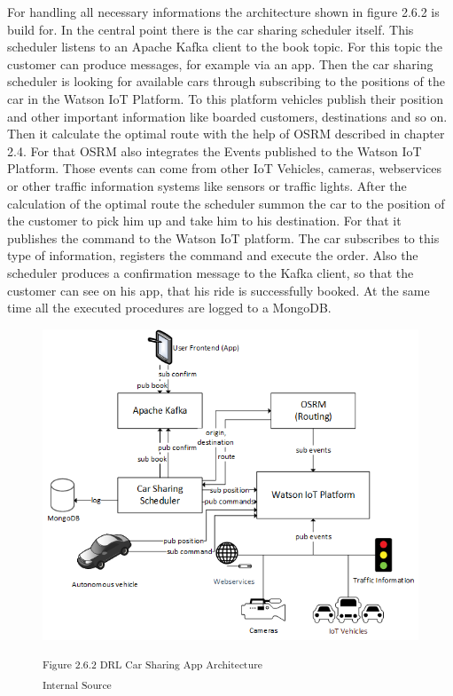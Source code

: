For handling all necessary informations the architecture shown in figure 2.6.2 is build for. In the central point there is the car sharing scheduler itself. This scheduler listens to an Apache Kafka client to the book topic. For this topic the customer can produce messages, for example via an app. Then the car sharing scheduler is looking for available cars through subscribing to the positions of the car in the Watson IoT Platform. To this platform vehicles publish their position and other important information like boarded customers, destinations and so on. Then it calculate the optimal route with the help of OSRM described in chapter 2.4. For that OSRM also integrates the Events published to the Watson IoT Platform. Those events can come from other IoT Vehicles, cameras, webservices or other traffic information systems like sensors or traffic lights. After the calculation of the optimal route the scheduler summon the car to the position of the customer to pick him up and take him to his destination. For that it publishes the command to the Watson IoT platform. The car subscribes to this type of information, registers the command and execute the order. Also the scheduler produces a confirmation message to the Kafka client, so that the customer can see on his app, that his ride is successfully booked. At the same time all the executed procedures are logged to a MongoDB.

\begin{figure}[h]
\centering
\includegraphics[width=\textwidth/5*4]{images/car_sharing_architecture.png}

\textsuperscript{Figure 2.6.2 DRL Car Sharing App Architecture}\\
\textsuperscript{Internal Source}
\end{figure}

